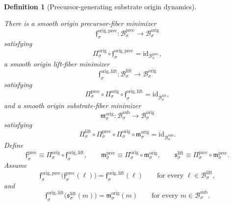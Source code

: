 \documentclass[11pt]{article}
\newcommand{\SubBody}[1]{\mathcal B_{#1}^{\mathrm{sub}}}
\newcommand{\LiftBody}[1]{\mathcal B_{#1}^{\mathrm{lift}}}
\newcommand{\LiftProj}[1]{\Pi_{#1}^{\mathrm{lift}}}
\newcommand{\LiftSelect}[1]{\mathfrak s_{#1}^{\mathrm{lift}}}
\newcommand{\PrecBody}[1]{\mathcal B_{#1}^{\mathrm{prec}}}
\newcommand{\PrecProj}[1]{\Pi_{#1}^{\mathrm{prec}}}
\newcommand{\PrecLiftMin}[1]{\mathfrak f_{#1}^{\mathrm{prec}}}
\newcommand{\PrecSubMin}[1]{\mathfrak m_{#1}^{\mathrm{prec}}}
\newcommand{\OrigBody}[1]{\mathcal B_{#1}^{\mathrm{orig}}}
\newcommand{\OrigProj}[1]{\Pi_{#1}^{\mathrm{orig}}}
\newcommand{\OrigPrecMin}[1]{\mathfrak f_{#1}^{\mathrm{orig,prec}}}
\newcommand{\OrigLiftMin}[1]{\mathfrak f_{#1}^{\mathrm{orig,lift}}}
\newcommand{\OrigSubMin}[1]{\mathfrak m_{#1}^{\mathrm{orig}}}
\newtheorem{definition}{Definition}
\begin{document}
\begin{definition}[Precursor-generating substrate origin dynamics]
\begin{enumerate}
    There is a smooth origin precursor-fiber minimizer
    \[
    \OrigPrecMin{\sigma}:\PrecBody{\sigma}\to\OrigBody{\sigma}
    \]
    satisfying
    \[
    \OrigProj{\sigma}\circ\OrigPrecMin{\sigma}
    =
    \mathrm{id}_{\PrecBody{\sigma}},
    \]
    a smooth origin lift-fiber minimizer
    \[
    \OrigLiftMin{\sigma}:\LiftBody{\sigma}\to\OrigBody{\sigma}
    \]
    satisfying
    \[
    \PrecProj{\sigma}\circ\OrigProj{\sigma}\circ\OrigLiftMin{\sigma}
    =
    \mathrm{id}_{\LiftBody{\sigma}},
    \]
    and a smooth origin substrate-fiber minimizer
    \[
    \OrigSubMin{\sigma}:\SubBody{\sigma}\to\OrigBody{\sigma}
    \]
    satisfying
    \[
    \LiftProj{\sigma}\circ\PrecProj{\sigma}\circ\OrigProj{\sigma}\circ\OrigSubMin{\sigma}
    =
    \mathrm{id}_{\SubBody{\sigma}}.
    \]
    Define
    \begin{equation}
    \PrecLiftMin{\sigma}
    \equiv
    \OrigProj{\sigma}\circ\OrigLiftMin{\sigma},
    \qquad
    \PrecSubMin{\sigma}
    \equiv
    \OrigProj{\sigma}\circ\OrigSubMin{\sigma},
    \qquad
    \LiftSelect{\sigma}
    \equiv
    \PrecProj{\sigma}\circ\PrecSubMin{\sigma}.
    \label{eq:originducedmin}
    \end{equation}
    Assume
    \begin{equation}
    \OrigPrecMin{\sigma}\bigl(\PrecLiftMin{\sigma}(\ell)\bigr)
    =
    \OrigLiftMin{\sigma}(\ell)
    \qquad
    \text{for every }\ell\in\LiftBody{\sigma},
    \label{eq:origcompatpreclift}
    \end{equation}
    and
    \begin{equation}
    \OrigLiftMin{\sigma}\bigl(\LiftSelect{\sigma}(m)\bigr)
    =
    \OrigSubMin{\sigma}(m)
    \qquad
    \text{for every }m\in\SubBody{\sigma}.
    \label{eq:origcompatliftsub}
    \end{equation}


\end{enumerate}
\end{definition}
\end{document}
